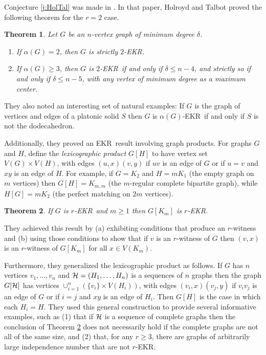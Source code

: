 \documentclass{article}
\newtheorem{thm}{Theorem}%
\def\a{{\alpha}}
\def\d{{\delta}}
\def\cH{{\cal H}}
\def\ekr{{\sf EKR}}
\begin{document}
Conjecture \ref{j:HolTal} was made in \cite{HolrTalb}.
In that paper, Holroyd and Talbot proved the following theorem for the $r=2$ case.

\begin{thm}
\label{t:Alpha}
Let $G$ be an $n$-vertex graph of minimum degree $\d$.
\begin{enumerate}
    \item 
    If $\a(G)=2$, then $G$ is strictly $2$-\ekr.
    \item 
    If $\a(G)\ge 3$, then $G$ is $2$-\ekr\ if and only if $\d\le n-4$, and strictly so if and only if $\d\le n-5$, with any vertex of minimum degree as a maximum center.
\end{enumerate}
\end{thm}

They also noted an interesting set of natural examples: If $G$ is the graph of vertices and edges of a platonic solid $S$ then $G$ is $\a(G)$-\ekr\ if and only if $S$ is not the dodecahedron.

Additionally, they proved an \ekr\ result involving graph products.
For graphs $G$ and $H$, define the {\it lexicographic product} $G[H]$ to have vertex set $V(G)\times V(H)$, with edges $(u,x)(v,y)$ if $uv$ is an edge of $G$ or if $u=v$ and $xy$ is an edge of $H$.
For example, if $G=K_2$ and $H=mK_1$ (the empty graph on $m$ vertices) then $G[H]=K_{m,m}$ (the $m$-regular complete bipartite graph), while $H[G]=mK_2$ (the perfect matching on $2m$ vertices).

\begin{thm}
\label{t:LexProd}
If $G$ is $r$-\ekr\ and $m\ge 1$ then $G[K_m]$ is $r$-\ekr.
\end{thm}

They achieved this result by (a) exhibiting conditions that produce an $r$-witness and (b) using those conditions to show that if $v$ is an $r$-witness of $G$ then $(v,x)$ is an $r$-witness of $G[K_m]$ for all $x\in V(K_m)$. 

Furthermore, they generalized the lexicographic product as follows.
If $G$ has $n$ vertices $v_1,\ldots,v_n$ and $\cH=(H_1,\ldots,H_n)$ is a sequences of $n$ graphs then the graph $G[\cH]$ has vertices $\cup_{i=1}^n (\{v_i\}\times V(H_i))$, with edges $(v_i,x)(v_j,y)$ if $v_iv_j$ is an edge of $G$ or if $i=j$ and $xy$ is an edge of $H_i$.
Then $G[H]$ is the case in which each $H_i=H$.
They used this general construction to provide several informative examples, such as (1) that if $\cH$ is a sequence of complete graphs then the conclusion of Theorem \ref{t:LexProd} does not necessarily hold if the complete graphs are not all of the same size, and (2) that, for any $r\ge 3$, there are graphs of arbitrarily large independence number that are not $r$-\ekr.
\end{document}
